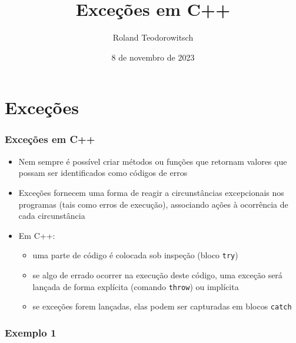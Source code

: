 \documentclass[xcolor={dvipsnames,table},aspectratio=169]{beamer}
\title[\sc{Exceções}]{  Exceções em C++}
\author[Roland Teodorowitsch]{Roland Teodorowitsch}
\institute[POO - EC - PUCRS]{Programação Orientada a Objetos - ECo - Curso de Engenharia de Computação - PUCRS}
\date{8 de novembro de 2023}
\begin{document}
\justifying

\begin{frame}
	\titlepage
\end{frame}

\section{Exceções}

\begin{frame}\frametitle{Exceções em C++}
\begin{itemize}
	\item Nem sempre é possível criar métodos ou funções que retornam valores que possam ser identificados como códigos de erros
	\item Exceções fornecem uma forma de reagir a circunstâncias excepcionais nos programas (tais como erros de execução), associando ações à ocorrência de cada circunstância
	\item Em C++:
	\begin{itemize}
        \item uma parte de código é colocada sob inspeção (bloco \texttt{try})
        \item se algo de errado ocorrer na execução deste código, uma exceção será lançada de forma explícita (comando \texttt{throw}) ou implícita
        \item se exceções forem lançadas, elas podem ser capturadas em blocos \texttt{catch}
    \end{itemize}
\end{itemize}
\end{frame}

\begin{frame}[fragile]\frametitle{Exemplo 1}

\end{frame}
\end{document}
